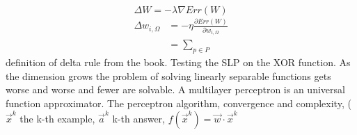 \[ 
    \Delta W = -\lambda \nabla Err(W) 
\]
\begin{align*}
    \Delta w_{i,\Omega} &= -\eta \frac{\partial Err(W)}{\partial w_{i,\Omega}}\\
    &=\sum_{p\in P}{}
\end{align*}
definition of delta rule from the book. Testing the SLP on the XOR function. As the dimension grows the problem of solving linearly separable functions gets worse and worse and fewer are solvable.  A multilayer perceptron is an universal function approximator. The perceptron algorithm, convergence and complexity, ($\vec{x}^k$ the k-th example, $\vec{a}^k$ k-th answer, $f(\vec{x}^k) = \vec{w}\cdot \vec{x}^k$
